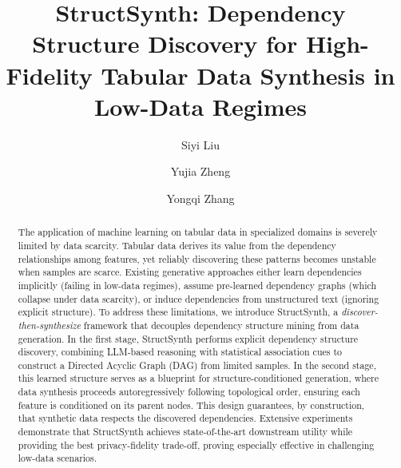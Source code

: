 \documentclass[sigconf,anonymous,review]{acmart}
\begin{document}
\title{StructSynth: Dependency Structure Discovery for High-Fidelity Tabular Data Synthesis in Low-Data Regimes}

\author{Siyi Liu}

\author{Yujia Zheng}

\author{Yongqi Zhang}

\renewcommand{\shortauthors}{Liu et al.}

\begin{abstract}
The application of machine learning on tabular data in specialized domains is severely limited by data scarcity. Tabular data derives its value from the dependency relationships among features, yet reliably discovering these patterns becomes unstable when samples are scarce. Existing generative approaches either learn dependencies implicitly (failing in low-data regimes), assume pre-learned dependency graphs (which collapse under data scarcity), or induce dependencies from unstructured text (ignoring explicit structure). To address these limitations, we introduce \textsf{StructSynth}, a \textit{discover-then-synthesize} framework that decouples dependency structure mining from data generation. In the first stage, \textsf{StructSynth} performs explicit dependency structure discovery, combining LLM-based reasoning with statistical association cues to construct a Directed Acyclic Graph (DAG) from limited samples. In the second stage, this learned structure serves as a blueprint for structure-conditioned generation, where data synthesis proceeds autoregressively following topological order, ensuring each feature is conditioned on its parent nodes. This design guarantees, by construction, that synthetic data respects the discovered dependencies. Extensive experiments demonstrate that \textsf{StructSynth} achieves state-of-the-art downstream utility while providing the best privacy-fidelity trade-off, proving especially effective in challenging low-data scenarios.
\end{abstract}
\end{document}
